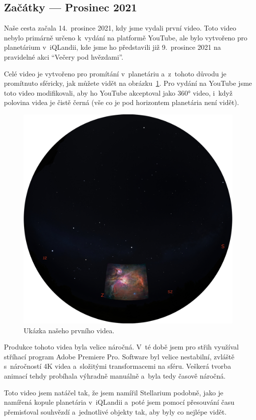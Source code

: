 \documentclass[12pt,a4paper,titlepage]{article}
\begin{document}
\subsection{Začátky --- Prosinec 2021}
Naše cesta začala 14.\ prosince 2021, kdy jsme vydali první video. Toto video nebylo primárně určeno k~vydání na platformě YouTube, ale bylo vytvořeno pro planetárium v~iQLandii, kde jsme ho představili již 9.\ prosince 2021 na pravidelné akci \enquote{Večery pod hvězdami}. 

Celé video je vytvořeno pro promítání v~planetáriu a~z~tohoto důvodu je promítnuto sféricky, jak můžete vidět na obrázku~\ref{img:prosinec}. Pro vydání na YouTube jsme toto video modifikovali, aby ho YouTube akceptoval jako 360° video, i~když polovina videa je čistě černá (vše co je pod horizontem planetária není vidět). 

\begin{figure}[H]
	\centering
	\includegraphics[width=.7\textwidth]{prosinec.eps}
	\caption{Ukázka našeho prvního videa.}\label{img:prosinec}
\end{figure}

Produkce tohoto videa byla velice náročná. V~té době jsem pro střih využíval stříhací program Adobe Premiere Pro. Software byl velice nestabilní, zvláště s~náročností 4K videa a~složitými transformacemi na sféru. Veškerá tvorba animací tehdy probíhala výhradně manuálně a~byla tedy časově náročná. 

Toto video jsem natáčel tak, že jsem namířil Stellarium podobně, jako je namířená kopule planetária v~iQLandii a~poté jsem pomocí přesouvání času přemisťoval souhvězdí a~jednotlivé objekty tak, aby byly co nejlépe vidět. 
\end{document}
